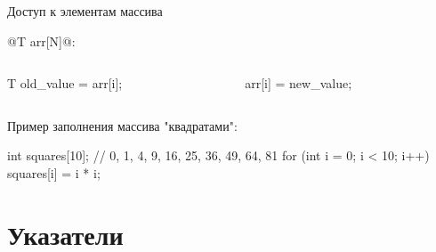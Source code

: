 \begin{frame}[fragile]{Доступ к элементам массива}

  @T arr[N]@:
  \begin{center}
  \end{center}

  \pause
  \begin{columns}[onlytextwidth,T]
    \begin{column}{0.5\textwidth}
      \begin{clisting}[escapechar=\!]
        T old_value = arr[i];
      \end{clisting}
    \end{column}

    \begin{column}{0.5\textwidth}
      \begin{clisting}[escapechar=\!]
        arr[i] = new_value;
      \end{clisting}
    \end{column}
  \end{columns}


  \pause
  Пример заполнения массива "квадратами":
  \begin{clisting}
    int squares[10]; // 0, 1, 4, 9, 16, 25, 36, 49, 64, 81
    for (int i = 0; i < 10; i++)
      squares[i] = i * i;
  \end{clisting}

\end{frame}


\section{Указатели}


\newcommand\memtop{1}
\newcommand\membottom{0}

\newcommand{\memline}[2]{
  \def\left{#1-0.45}
  \def\right{#2+0.45}

  \draw[byte lines] (\left,\membottom) grid (\right,\memtop);

  \foreach \y in {\membottom, \memtop}
    \draw (\left,\y) -- (\right,\y);

  \foreach \x in {\left, \right}
    \draw [decorate,decoration={snake,amplitude=0.3mm,segment length=3mm}]
      (\x,\membottom) -- (\x,\memtop);
}

